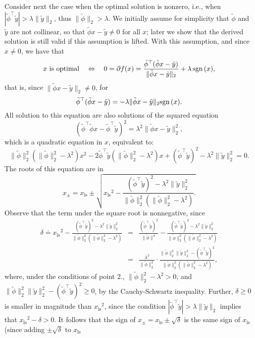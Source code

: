 \documentclass[11pt]{article}
\newcommand{\tran}{^{\top}}
\newcommand{\lam}{\lambda}
\newcommand{\sign}{{\mbox{\rm sgn}\,}}
\newcommand{\beq}{\begin{equation}}
\newcommand{\eeq}{\end{equation}}
\newcommand{\beas}{\begin{eqnarray*}}
\newcommand{\eeas}{\end{eqnarray*}}
\newcommand{\ped}[1]{{_{\mathrm{#1}}}}
\begin{document}
\vspace{.2cm}
Consider next the case when the optimal solution is nonzero, i.e., when $|\tilde \phi\tran \tilde y| >\lam \|\tilde y\|_2$,
thus $\|\tilde \phi\|_2 > \lam$. We initially assume for simplicity that $\tilde \phi$ and $\tilde y$ are not collinear, so that
$\tilde \phi x - \tilde y\neq 0$ for all $x$; later we show that the derived solution is still valid if this assumption is lifted.
With this assumption, and since $x\neq 0$, we have that
\[
x \mbox{ is optimal}\quad \Leftrightarrow \quad
0 =\partial f(x) = \frac{\tilde \phi\tran (\tilde \phi x -  \tilde y)}{\|\tilde \phi x - \tilde y\|_2 } + \lam\,\sign(x),
\]
that is, since $\|\tilde \phi x - \tilde y\|_2\neq 0$, for
\beq
\tilde \phi\tran (\tilde \phi x -  \tilde y) = -\lam  \|\tilde \phi x - \tilde y\|_2\sign(x).
\label{eq:univariate_sqrtLASSO_rooteq}
\eeq
All solution to this equation are also solutions of the squared equation
\beq
(\tilde \phi\tran \tilde \phi x - \tilde \phi\tran \tilde y)^2 = \lam^2  \|\tilde \phi x - \tilde y\|_2^2,
\label{eq:univariate_sqrtLASSO_rooteqsq}
\eeq
which is a quadratic equation in $x$, equivalent to:
\[
\|\tilde \phi\|_2^2(\|\tilde \phi\|_2^2-\lam^2) x^2 -2\tilde \phi\tran \tilde y (\|\tilde \phi\|_2^2-\lam^2) x+ (\tilde \phi\tran \tilde y)^2-\lam^2\|\tilde y\|_2^2 = 0.
\]
The roots of this equation are in
\[
x_{\pm} = x\ped{ls} \pm \sqrt{  x\ped{ls}^2 - \frac{(\tilde \phi\tran \tilde y)^2-\lam^2\|\tilde y\|_2^2}
{\|\tilde \phi\|_2^2(\|\tilde \phi\|_2^2-\lam^2)}.
}
\]
Observe that the term under the square root is nonnegative, since
\beas
\delta \doteq x\ped{ls}^2 - \frac{(\tilde \phi\tran \tilde y)^2-\lam^2\|\tilde y\|_2^2}
{\|\tilde \phi\|_2^2(\|\tilde \phi\|_2^2-\lam^2) }&=&
\frac{(\tilde \phi\tran \tilde y)^2}{\|\tilde \phi\|^4} - \frac{(\tilde \phi\tran \tilde y)^2-\lam^2\|\tilde y\|_2^2}
{\|\tilde \phi\|_2^2(\|\tilde \phi\|_2^2-\lam^2)}  \\
&=& \frac{\lam^2}{\|\tilde \phi\|_2^2}\cdot \frac{\|\tilde \phi\|_2^2\|\tilde y\|_2^2 - (\tilde \phi\tran \tilde y)^2}
{\|\tilde \phi\|_2^2(\|\tilde \phi\|_2^2-\lam^2) },
\eeas
where, under the conditions of point 2., $\|\tilde \phi\|_2^2-\lam^2 > 0$, and 
$\|\tilde \phi\|_2^2\|\tilde y\|_2^2 - (\tilde \phi\tran \tilde y)^2 \geq 0$, by the Cauchy-Schwartz inequality.
Further,  $\delta\geq 0$ is smaller in magnitude than $x\ped{ls}^2$, since
the condition $|\tilde \phi\tran \tilde y| >\lam \|\tilde y\|_2$
implies that $x\ped{ls}^2 - \delta > 0 $.
It follows that the sign of $x_\pm = x\ped{ls} \pm \sqrt{\delta}$
is the same sign of $x\ped{ls}$ (since adding $\pm \sqrt{\delta}$ to $x\ped{ls}$
\end{document}
